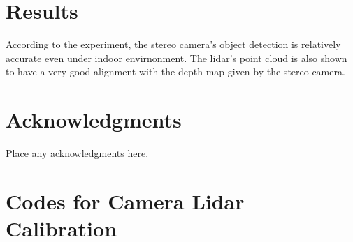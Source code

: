 \documentclass[balance,upint,subscriptcorrection,varvw,nofoot, mathalfa=cal=boondoxo,spanish,french,vietnamese,russian,greek,pdf-a,fontspec,colorlinks]{asmeconf}
\begin{document}


\section{Results}

According to the experiment, the stereo camera’s object detection is relatively accurate even under indoor
envirnonment. The lidar’s point cloud is also shown to have a very good alignment with the depth map given by
the stereo camera.



\section*{Acknowledgments}
Place any acknowledgments here.



\nocite{*}%



\appendix


\newpage
\section[Camera Lidar Calibration]{Codes for Camera Lidar Calibration}\label{appendix:a}
\end{document}
